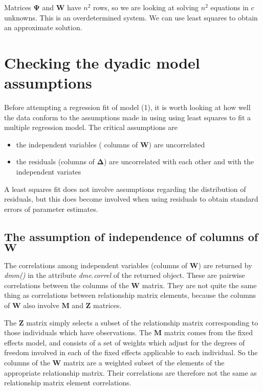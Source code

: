 \documentclass[titlepage]{article}  %
\begin{document}
Matrices $\bm{\Psi}$ and $\bm{W}$ have $n^{2}$ rows, so we are looking at solving $n^{2}$ equations in $c$ unknowns. This is an overdetermined system. We can use least squares to obtain an approximate solution. 

\section{Checking the dyadic model assumptions}
Before attempting a regression fit of model (1), it is worth looking at how well the data conform to the assumptions made in using using least squares to fit a multiple regression model. The critical assumptions are

\begin{itemize}
\item the independent variables ( columns of $\bm{W}$) are uncorrelated
\item the residuals (columns of $\bm{\Delta}$) are uncorrelated with each other and with the independent variates
\end{itemize}

A least squares fit does not involve assumptions regarding the distribution of residuals, but this does become involved when using residuals to obtain standard errors of parameter estimates.

\subsection{The assumption of independence of columns of $\bm{W}$}

The correlations among independent variables (columns of $\bm{W}$) are returned by {\em dmm()} in the attribute {\em dme.correl} of the returned object.  These are pairwise correlations between the columns of the $\bm{W}$ matrix. They are not quite the same thing as correlations between relationship matrix elements, because the columns of $\bm{W}$ also involve $\bm{M}$ and $\bm{Z}$ matrices.

The $\bm{Z}$ matrix simply selects a subset of the relationship matrix corresponding to those individuals which have observations. The $\bm{M}$ matrix comes from the fixed effects model, and consists of a set of weights which adjust for the degrees of freedom involved in each of the fixed effects applicable to each individual. So the columns of the $\bm{W}$ matrix are a weighted subset of the elements of the appropriate relationship matrix. Their correlations are therefore not the same as relationship matrix element correlations.
\end{document}
